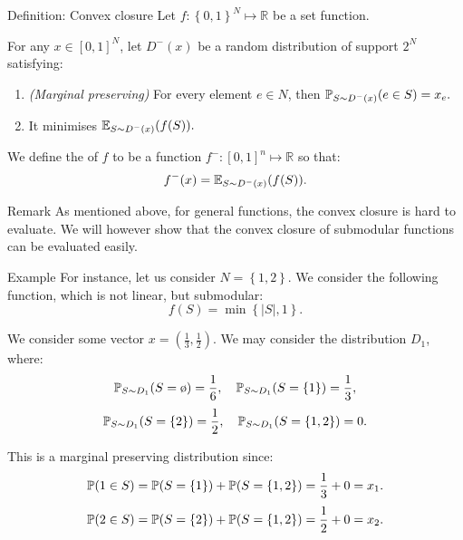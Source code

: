 \documentclass[a4paper]{article}
\begin{document}
\begin{parag}{Definition: Convex closure}
    Let $f: \left\{0, 1\right\}^N \mapsto \mathbb{R}$ be a set function.

    For any $x \in \left[0, 1\right]^N$, let $D^-\left(x\right)$ be a random distribution of support $2^N$ satisfying:
    \begin{enumerate}
        \item \textit{(Marginal preserving)} For every element $e \in N$, then $\displaystyle \prob_{S \followsdistr D^-\left(x\right)}\left(e \in S\right) = x_e.$
        \item It minimises $\displaystyle \exval_{S \followsdistr D^-\left(x\right)}\left(f\left(S\right)\right).$
    \end{enumerate}

    We define the  of $f$ to be a function $f^-: \left[0, 1\right]^n \mapsto \mathbb{R}$ so that: 
    \[f^-\left(x\right) = \exval_{S \followsdistr D^-\left(x\right)}\left(f\left(S\right)\right).\]

    \begin{subparag}{Remark}
        As mentioned above, for general functions, the convex closure is hard to evaluate. We will however show that the convex closure of submodular functions can be evaluated easily.
    \end{subparag}
   
    \begin{subparag}{Example}
        For instance, let us consider $N = \left\{1, 2\right\}$. We consider the following function, which is not linear, but submodular: 
        \[f\left(S\right) = \min\left\{\left|S\right|, 1\right\}.\]
        
        We consider some vector $x = \left(\frac{1}{3}, \frac{1}{2}\right)$. We may consider the distribution $D_1$, where:
        \[\prob_{S \followsdistr D_1}\left(S = \o\right) = \frac{1}{6}, \mathspace \prob_{S \followsdistr D_1}\left(S = \left\{1\right\}\right) = \frac{1}{3},\]
        \[\prob_{S \followsdistr D_1}\left(S = \left\{2\right\}\right) = \frac{1}{2}, \mathspace \prob_{S \followsdistr D_1}\left(S = \left\{1, 2\right\}\right) = 0.\]

        This is a marginal preserving distribution since: 
        \[\prob\left(1 \in S\right) = \prob\left(S = \left\{1\right\}\right) + \prob\left(S = \left\{1, 2\right\}\right) = \frac{1}{3} + 0 = x_1.\]
        \[\prob\left(2 \in S\right) = \prob\left(S = \left\{2\right\}\right) + \prob\left(S = \left\{1, 2\right\}\right)  = \frac{1}{2} + 0 = x_2.\]


\end{subparag}
\end{parag}
\end{document}
